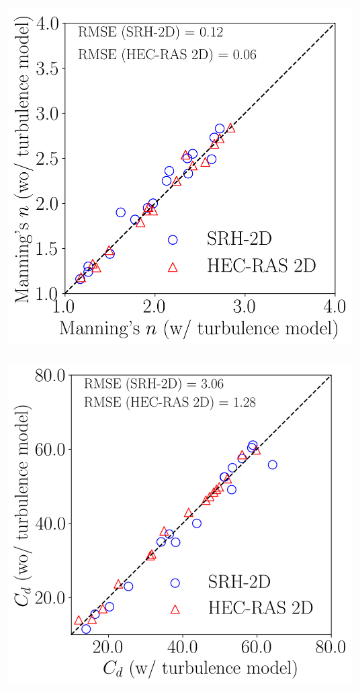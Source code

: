 \documentclass[preview, border=2pt]{standalone}
\begin{document}
\begin{figure}
     \centering
     \begin{subfigure}[c]{0.49\textwidth}
         \centering
         \caption{}
         \includegraphics[width=\textwidth]{effect_of_turbulence_model_on_ManningN.png}
     \end{subfigure}
     \hfill     
     \begin{subfigure}[c]{0.49\textwidth}
         \centering
         \caption{}
         \includegraphics[width=\textwidth]{effect_of_turbulence_model_on_Cd.png}
     \end{subfigure}
\end{figure}
\end{document}
